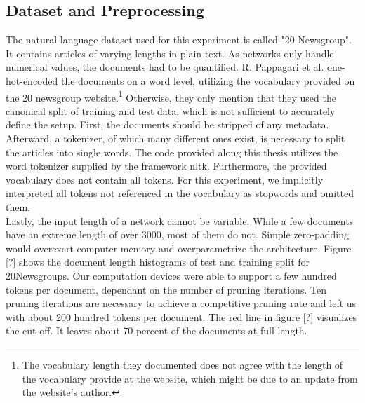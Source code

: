 \subsection*{Dataset and Preprocessing}
The natural language dataset used for this experiment is called "20 Newsgroup". It contains articles of varying lengths in plain text. As networks only handle numerical values, the documents had to be quantified. R. Pappagari et al. one-hot-encoded the documents on a word level, utilizing the vocabulary provided on the 20 newsgroup website.\footnote{
	The vocabulary length they documented does not agree with the length of the vocabulary provide at the website, which might be due to an update from the website's author. 
}\cite{End-to-End-CNN} 
Otherwise, they only mention that they used the canonical split of training and test data, which is not sufficient to accurately define the setup. First, the documents should be stripped of any metadata. Afterward, a tokenizer, of which many different ones exist, is necessary to split the articles into single words. The code provided along this thesis utilizes the word tokenizer supplied by the framework nltk. Furthermore, the provided vocabulary does not contain all tokens. For this experiment, we implicitly interpreted all tokens not referenced in the vocabulary as stopwords and omitted them.\\
Lastly, the input length of a network cannot be variable. While a few documents have an extreme length of over 3000, most of them do not. Simple zero-padding would overexert computer memory and overparametrize the architecture. Figure [?] shows the document length histograms of test and training split for 20Newsgroups. Our computation devices were able to support a few hundred tokens per document, dependant on the number of pruning iterations. Ten pruning iterations are necessary to achieve a competitive pruning rate and left us with about 200 hundred tokens per document. The red line in figure [?] visualizes the cut-off. It leaves about 70 percent of the documents at full length.


